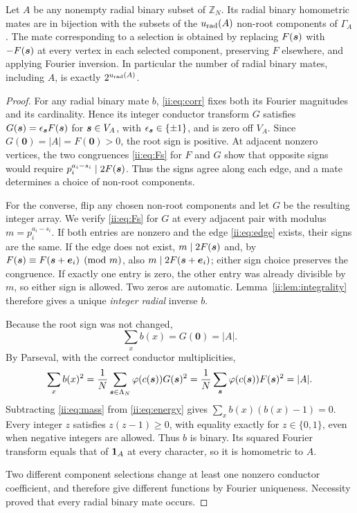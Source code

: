 \begin{theorem}\label{ii:thm:radial}
Let $A$ be any nonempty radial binary subset of $\mathbb Z_N$.  Its radial binary homometric mates are in bijection with the subsets of the $u_{\rm rad}(A)$ non-root components of $\Gamma_A$.  The mate corresponding to a selection is obtained by replacing $F(\boldsymbol{s})$ with $-F(\boldsymbol{s})$ at every vertex in each selected component, preserving $F$ elsewhere, and applying Fourier inversion.  In particular the number of radial binary mates, including $A$, is exactly $2^{u_{\rm rad}(A)}$.
\end{theorem}
\begin{proof}
For any radial binary mate $b$, \eqref{ii:eq:corr} fixes both its Fourier magnitudes and its cardinality.  Hence its integer conductor transform $G$ satisfies $G(\boldsymbol{s})=\epsilon_{\boldsymbol{s}}F(\boldsymbol{s})$ for $\boldsymbol{s}\in V_A$, with $\epsilon_{\boldsymbol{s}}\in\{\pm1\}$, and is zero off $V_A$.  Since $G(\boldsymbol0)=|A|=F(\boldsymbol0)>0$, the root sign is positive.  At adjacent nonzero vertices, the two congruences \eqref{ii:eq:Fs} for $F$ and $G$ show that opposite signs would require $p_i^{a_i-s_i}\mid2F(\boldsymbol{s})$.  Thus the signs agree along each edge, and a mate determines a choice of non-root components.

For the converse, flip any chosen non-root components and let $G$ be the resulting integer array.  We verify \eqref{ii:eq:Fs} for $G$ at every adjacent pair with modulus $m=p_i^{a_i-s_i}$.  If both entries are nonzero and the edge \eqref{ii:eq:edge} exists, their signs are the same.  If the edge does not exist, $m\mid2F(\boldsymbol{s})$ and, by $F(\boldsymbol{s})\equiv F(\boldsymbol{s}+\boldsymbol{e}_i)\pmod m$, also $m\mid2F(\boldsymbol{s}+\boldsymbol{e}_i)$; either sign choice preserves the congruence.  If exactly one entry is zero, the other entry was already divisible by $m$, so either sign is allowed.  Two zeros are automatic.  Lemma~\ref{ii:lem:integrality} therefore gives a unique \emph{integer radial} inverse $b$.

Because the root sign was not changed,
\begin{equation}\label{ii:eq:mass}
 \sum_x b(x)=G(\boldsymbol0)=|A|.
\end{equation}
By Parseval, with the correct conductor multiplicities,
\begin{equation}\label{ii:eq:energy}
 \sum_x b(x)^2=\frac1N\sum_{\boldsymbol{s}\in\Lambda_N}
 \varphi(c(\boldsymbol{s}))G(\boldsymbol{s})^2
 =\frac1N\sum_{\boldsymbol{s}}\varphi(c(\boldsymbol{s}))F(\boldsymbol{s})^2=|A|.
\end{equation}
Subtracting \eqref{ii:eq:mass} from \eqref{ii:eq:energy} gives $\sum_x b(x)(b(x)-1)=0$.  Every integer $z$ satisfies $z(z-1)\ge0$, with equality exactly for $z\in\{0,1\}$, even when negative integers are allowed.  Thus $b$ is binary.  Its squared Fourier transform equals that of $\mathbf 1_A$ at every character, so it is homometric to $A$.

Two different component selections change at least one nonzero conductor coefficient, and therefore give different functions by Fourier uniqueness.  Necessity proved that every radial binary mate occurs.\qedhere
\end{proof}

